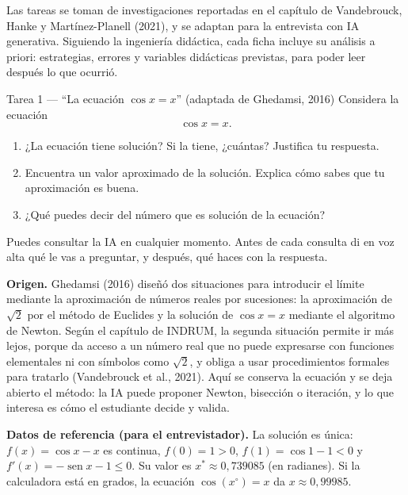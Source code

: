 \documentclass[11pt,letterpaper]{article}
\newcounter{preg}
\begin{document}
Las tareas se toman de investigaciones reportadas en el capítulo de Vandebrouck, Hanke y Martínez-Planell (2021), y se adaptan para la entrevista con IA generativa. Siguiendo la ingeniería didáctica, cada ficha incluye su análisis a priori: estrategias, errores y variables didácticas previstas, para poder leer después lo que ocurrió.

\begin{tarea}{Tarea 1 --- ``La ecuación $\cos x = x$'' (adaptada de Ghedamsi, 2016)}
Considera la ecuación
\[
\cos x = x .
\]
\begin{enumerate}[label=\alph*)]
  \item ¿La ecuación tiene solución? Si la tiene, ¿cuántas? Justifica tu respuesta.
  \item Encuentra un valor aproximado de la solución. Explica cómo sabes que tu aproximación es buena.
  \item ¿Qué puedes decir del número que es solución de la ecuación?
\end{enumerate}
Puedes consultar la IA en cualquier momento. Antes de cada consulta di en voz alta qué le vas a preguntar, y después, qué haces con la respuesta.
\end{tarea}

\noindent\textbf{Origen.} Ghedamsi (2016) diseñó dos situaciones para introducir el límite mediante la aproximación de números reales por sucesiones: la aproximación de $\sqrt{2}$ por el método de Euclides y la solución de $\cos x = x$ mediante el algoritmo de Newton. Según el capítulo de INDRUM, la segunda situación permite ir más lejos, porque da acceso a un número real que no puede expresarse con funciones elementales ni con símbolos como $\sqrt{2}$, y obliga a usar procedimientos formales para tratarlo (Vandebrouck et al., 2021). Aquí se conserva la ecuación y se deja abierto el método: la IA puede proponer Newton, bisección o iteración, y lo que interesa es cómo el estudiante decide y valida.

\noindent\textbf{Datos de referencia (para el entrevistador).} La solución es única: $f(x) = \cos x - x$ es continua, $f(0) = 1 > 0$, $f(1) = \cos 1 - 1 < 0$ y $f'(x) = -\operatorname{sen} x - 1 \le 0$. Su valor es $x^\ast \approx 0{,}739085$ (en radianes). Si la calculadora está en grados, la ecuación $\cos(x^\circ) = x$ da $x \approx 0{,}99985$.
\end{document}
